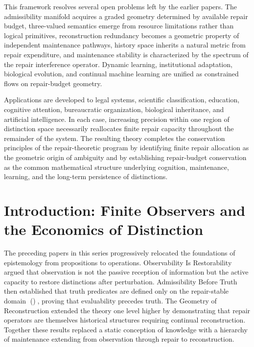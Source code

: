 \documentclass[12pt,oneside]{article}
\theoremstyle{plain}
\theoremstyle{definition}
\theoremstyle{remark}
\DeclareMathOperator{\Rest}{Rest}
\begin{document}
This framework resolves several open problems left by the earlier papers. The admissibility manifold acquires a graded geometry determined by available repair budget, three-valued semantics emerge from resource limitations rather than logical primitives, reconstruction redundancy becomes a geometric property of independent maintenance pathways, history space inherits a natural metric from repair expenditure, and maintenance stability is characterized by the spectrum of the repair interference operator. Dynamic learning, institutional adaptation, biological evolution, and continual machine learning are unified as constrained flows on repair-budget geometry.

Applications are developed to legal systems, scientific classification, education, cognitive attention, bureaucratic organization, biological inheritance, and artificial intelligence. In each case, increasing precision within one region of distinction space necessarily reallocates finite repair capacity throughout the remainder of the system. The resulting theory completes the conservation principles of the repair-theoretic program by identifying finite repair allocation as the geometric origin of ambiguity and by establishing repair-budget conservation as the common mathematical structure underlying cognition, maintenance, learning, and the long-term persistence of distinctions.

\newpage

\section{Introduction: Finite Observers and the Economics of Distinction}

The preceding papers in this series progressively relocated the foundations of epistemology from propositions to operations. Observability Is Restorability argued that observation is not the passive reception of information but the active capacity to restore distinctions after perturbation. Admissibility Before Truth then established that truth predicates are defined only on the repair-stable domain \Rest(), proving that evaluability precedes truth. The Geometry of Reconstruction extended the theory one level higher by demonstrating that repair operators are themselves historical structures requiring continual reconstruction. Together these results replaced a static conception of knowledge with a hierarchy of maintenance extending from observation through repair to reconstruction.
\end{document}

